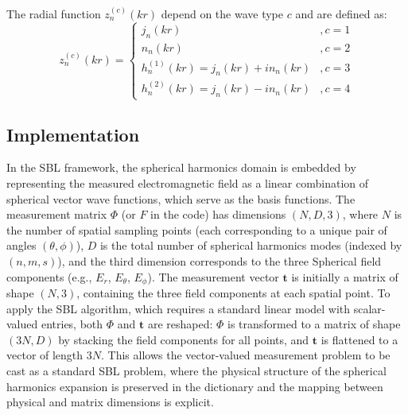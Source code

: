 \documentclass{article}
\begin{document}
The radial function \(z_n^{(c)}(kr)\) depend on the wave type \(c\) and are defined as:
\begin{equation}
    z_n^{(c)}(kr) = \begin{cases}
        j_n(kr) & , c = 1 \\
        n_n(kr) & , c = 2 \\
        h_n^{(1)}(kr) = j_n(kr) + i n_n(kr) & , c = 3 \\
        h_n^{(2)}(kr) = j_n(kr) - i n_n(kr) & , c = 4
    \end{cases}
\end{equation}
\subsection{Implementation}
In the SBL framework, the spherical harmonics domain is embedded by representing the measured electromagnetic field as a linear combination of spherical vector wave functions, which serve as the basis functions. The measurement matrix $\Phi$ (or $F$ in the code) has dimensions $(N, D, 3)$, where $N$ is the number of spatial sampling points (each corresponding to a unique pair of angles $(\theta, \phi)$), $D$ is the total number of spherical harmonics modes (indexed by $(n, m, s)$), and the third dimension corresponds to the three Spherical field components (e.g., $E_r$, $E_\theta$, $E_\phi$). The measurement vector $\mathbf{t}$ is initially a matrix of shape $(N, 3)$, containing the three field components at each spatial point. To apply the SBL algorithm, which requires a standard linear model with scalar-valued entries, both $\Phi$ and $\mathbf{t}$ are reshaped: $\Phi$ is transformed to a matrix of shape $(3N, D)$ by stacking the field components for all points, and $\mathbf{t}$ is flattened to a vector of length $3N$. This allows the vector-valued measurement problem to be cast as a standard SBL problem, where the physical structure of the spherical harmonics expansion is preserved in the dictionary and the mapping between physical and matrix dimensions is explicit.




\end{document}
